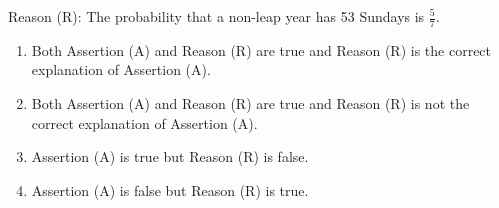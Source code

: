 \documentclass{article}
\begin{document}
\begin{enumerate}
Reason (R): The probability that a non-leap year has 53 Sundays is \(\frac{5}{7}\).

\begin{enumerate}
    \item Both Assertion (A) and Reason (R) are true and Reason (R) is the correct explanation of Assertion (A).
    \item Both Assertion (A) and Reason (R) are true and Reason (R) is not the correct explanation of Assertion (A).
    \item Assertion (A) is true but Reason (R) is false.
    \item Assertion (A) is false but Reason (R) is true.
\end{enumerate}

\end{enumerate}
\end{document}
